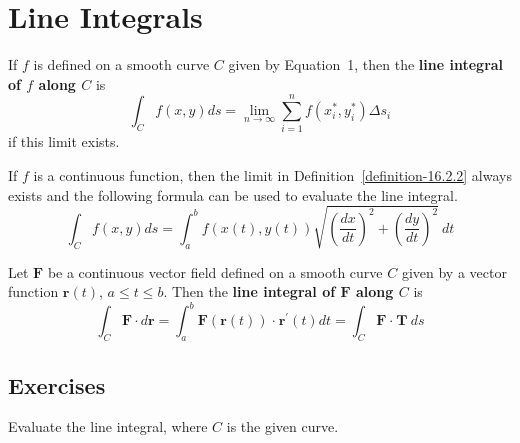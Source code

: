 \section{Line Integrals}
\begin{definition}
	\label{definition-16.2.2}
	If $f$ is defined on a smooth curve $C$ given by Equation~1, then the \textbf{line integral of $f$ along $C$} is
	\begin{equation}
	\int_C f\left(x,y\right)ds = \lim\limits_{n \to \infty} \sum_{i=1}^{n} f\left(x_i^*,y_i^*\right)\Delta s_i
	\end{equation}
	if this limit exists.
\end{definition}
\begin{definition}
	If $f$ is a continuous function, then the limit in Definition~\ref{definition-16.2.2} always exists and the following formula can be used to evaluate the line integral.
	\begin{equation}
	\int_C f\left(x,y\right)ds = \int_a^b f\left(x(t),y(t)\right)\sqrt{\left(\frac{dx}{dt}\right)^2 + \left(\frac{dy}{dt}\right)^2} \ dt
	\end{equation}
\end{definition}
\begin{definition}
	Let $\mathbf{F}$ be a continuous vector field defined on a smooth curve $C$ given by a vector function $\mathbf{r}\left(t\right)$, $a \leq t \leq b$. Then the \textbf{line integral of $\mathbf{F}$ along $C$} is
	\begin{equation}
	\int_C \mathbf{F} \cdot d\mathbf{r} = \int_a^b \mathbf{F}\left(\mathbf{r}\left(t\right)\right) \  \mathbf{\cdot} \  \mathbf{r}^{\prime}\left(t\right) dt = \int_C \mathbf{F} \ \mathbf{\cdot} \ \mathbf{T} \  ds
	\end{equation}
\end{definition}

\subsection{Exercises}
Evaluate the line integral, where $C$ is the given curve.

